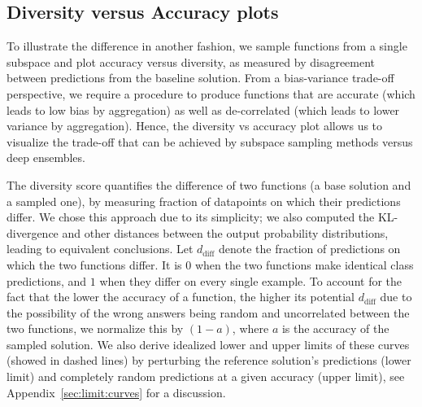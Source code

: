 \documentclass{article}
\begin{document}
 \subsection{Diversity versus Accuracy plots} 
 
%
 To illustrate  the difference in another fashion, 
 we sample functions from a single subspace and plot accuracy versus diversity, as measured by disagreement between predictions from the baseline solution. From a bias-variance trade-off perspective, we require a procedure to produce functions that are accurate (which leads to low bias by aggregation) as well as de-correlated (which leads to lower variance by aggregation). Hence, the diversity vs accuracy plot allows us to visualize the trade-off that can be achieved by subspace sampling methods versus deep ensembles.  %

The diversity score quantifies the difference of two functions (a base solution and a sampled one), by measuring fraction of  datapoints on which their predictions differ. 
We chose this approach due to its simplicity; we also computed the KL-divergence and other distances between the output probability distributions, leading to equivalent conclusions.  %
Let $d_\mathrm{diff}$ denote the fraction of predictions on which the two functions differ. It is $0$ when the two functions make identical class predictions, and $1$ when they differ on every single example. To account for the fact that the lower the accuracy of a function, the higher its potential $d_\mathrm{diff}$ due to the possibility of the wrong answers being random and uncorrelated between the two functions, we normalize this by $(1 - a)$, where $a$ is the accuracy of the sampled solution. We also derive idealized lower and upper limits of these curves (showed in dashed lines) by perturbing the reference solution's predictions (lower limit) and completely random predictions at a given accuracy (upper limit), see Appendix~\ref{sec:limit:curves} for a discussion. 
\end{document}
